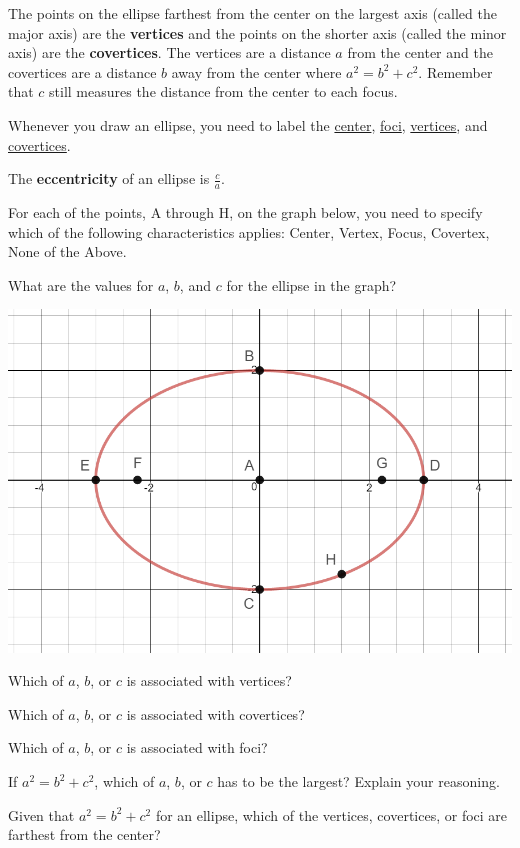 \begin{info}
The points on the ellipse farthest from the center on the largest axis (called the major axis) are the \textbf{vertices} and the points on the shorter axis (called the minor axis) are the \textbf{covertices}. The vertices are a distance $a$ from the center and the covertices are a distance $b$ away from the center where $a^2=b^2+c^2$. Remember that $c$ still measures the distance from the center to each focus.

Whenever you draw an ellipse, you need to label the \underline{center}, \underline{foci}, \underline{vertices}, and \underline{covertices}.

The \textbf{eccentricity} of an ellipse is $\frac{c}{a}$. \end{info}
\bq For each of the points, A through H, on the graph below, you need to specify which of the following characteristics applies: Center, Vertex, Focus, Covertex, None of the Above.

What are the values for $a$, $b$, and $c$ for the ellipse in the graph?
\eq
\begin{center} \includegraphics[scale=.5]{ellipse4.png} \end{center}
\bq \be
\item Which of $a$, $b$, or $c$ is associated with vertices?
\item Which of $a$, $b$, or $c$ is associated with covertices?
\item Which of $a$, $b$, or $c$ is associated with foci?
\item If $a^2=b^2+c^2$, which of $a$, $b$, or $c$ has to be the largest? Explain your reasoning.
\item Given that $a^2=b^2+c^2$ for an ellipse, which of the vertices, covertices, or foci are farthest from the center? \ee \eq

